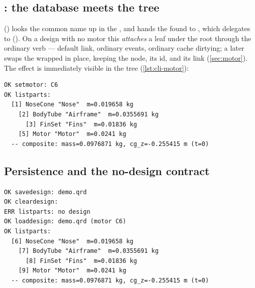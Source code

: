 \subsection[setmotor: the database meets the tree]{: the database meets the tree}\label{sec:cli-motor}

 () looks the common name up in the
, and hands the found  to
, which delegates to 
(). On a design with no motor this \emph{attaches} a
 leaf under the root through the ordinary  verb --- default 
link, ordinary events, ordinary cache dirtying; a later  swaps the wrapped
 in place, keeping the node, its id, and its link (\cref{sec:motor}). The effect
is immediately visible in the tree (\cref{lst:cli-motor}):

\begin{listing}[htbp]
\begin{verbatim}
OK setmotor: C6
OK listparts:
  [1] NoseCone "Nose"  m=0.019658 kg
    [2] BodyTube "Airframe"  m=0.0355691 kg
      [3] FinSet "Fins"  m=0.01836 kg
    [5] Motor "Motor"  m=0.0241 kg
  -- composite: mass=0.0976871 kg, cg_z=-0.255415 m (t=0)
\end{verbatim}
\caption{The motor is a tree citizen: node 5 appears as a child of the root, its $24.1\unit{g}$
loaded weight joins the composite, and the CG moves aft accordingly --- no separate motor mass
bookkeeping anywhere.}\label{lst:cli-motor}
\end{listing}

\subsection{Persistence and the no-design contract}\label{sec:cli-persist}

\begin{listing}[htbp]
\begin{verbatim}
OK savedesign: demo.qrd
OK cleardesign:
ERR listparts: no design
OK loaddesign: demo.qrd (motor C6)
OK listparts:
  [6] NoseCone "Nose"  m=0.019658 kg
    [7] BodyTube "Airframe"  m=0.0355691 kg
      [8] FinSet "Fins"  m=0.01836 kg
    [9] Motor "Motor"  m=0.0241 kg
  -- composite: mass=0.0976871 kg, cg_z=-0.255415 m (t=0)
\end{verbatim}
\caption{The round trip.  leaves a genuinely empty model --- not a placeholder
--- so the next  fails the  contract. On reload the identical
physics returns under fresh ids 6--9, and the motor is re-resolved by common
name.}\label{lst:cli-persist}
\end{listing}

